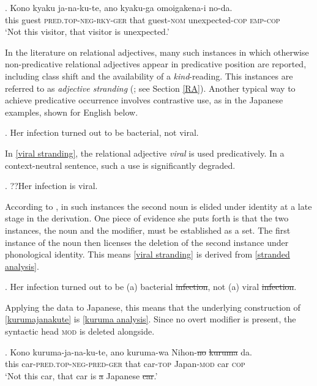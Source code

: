\exg. Kono kyaku ja-na-ku-te, ano kyaku-ga omoigakena-i no-da.\\
this guest \textsc{pred.top-neg-rky-ger} that guest-\textsc{nom} unexpected-\textsc{cop} \textsc{emp-cop}\\
`Not this visitor, that visitor is unexpected.' \\ \null \hfill \citep[11]{hoshi:2002:kaynean}

In the literature on relational adjectives, many such instances in which otherwise non-predicative relational adjectives appear in predicative position are reported, including class shift and the availability of a \textit{kind}-reading. This instances are referred to as \textit{adjective stranding} (\citealt{levi:1978:syntax, mcnally:2004:relational, nagano:2018:conversion}; see Section \ref{RA}). Another typical way to achieve predicative occurrence involves contrastive use, as in the Japanese examples, shown for  English below. 

\ex. Her infection turned out to be bacterial, not viral. \null \hfill \citep[254]{levi:1978:syntax} \label{viral stranding}

In \ref{viral stranding}, the relational adjective \textit{viral} is used predicatively. In a context-neutral sentence, such a use is significantly degraded.

\ex. ??Her infection is viral.

According to \citet[255]{levi:1978:syntax}, in such instances the second noun is elided under identity at a late stage in the derivation. One piece of evidence she puts forth is that the two instances, the noun and the modifier, must be established as a set. The first instance of the noun then licenses the deletion of the second instance under phonological identity. This means \ref{viral stranding} is derived from \ref{stranded analysis}.

\ex. Her infection turned out to be (a) bacterial \st{infection}, not (a) viral \st{infection}. \\ \null \hfill \citep[254]{levi:1978:syntax}\label{stranded analysis}

Applying the data to Japanese, this means that the underlying construction of \ref{kurumajanakute} is \ref{kuruma analysis}. Since no overt modifier is present, the syntactic head \textsc{mod} is deleted alongside.

\exg. Kono kuruma-ja-na-ku-te, ano kuruma-wa Nihon-\st{no} \st{kuruma} da.\\
this car-\textsc{pred.top-neg-pred-ger} that car-\textsc{top} Japan-\textsc{mod} car \textsc{cop}\\
`Not this car, that car is \st{a} Japanese \st{car}.’ \label{kuruma analysis}

